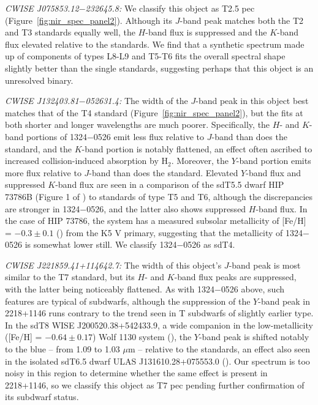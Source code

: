 \documentclass[twocolumn,tighten,twocolappendix]{aastex631}
\begin{document}
{\it CWISE J075853.12$-$232645.8:} We classify this object as T2.5 pec (Figure~\ref{fig:nir_spec_panel2}). Although its $J$-band peak matches both the T2 and T3 standards equally well, the $H$-band flux is suppressed and the $K$-band flux elevated relative to the standards. We find that a synthetic spectrum made up of components of types L8-L9 and T5-T6 fits the overall spectral shape slightly better than the single standards, suggesting perhaps that this object is an unresolved binary.

{\it CWISE J132403.81$-$052631.4:} The width of the $J$-band peak in this object best matches that of the T4 standard (Figure~\ref{fig:nir_spec_panel2}), but the fits at both shorter and longer wavelengths are much poorer. Specifically, the $H$- and $K$-band portions of 1324$-$0526 emit less flux relative to $J$-band than does the standard, and the $K$-band portion is notably flattened, an effect often ascribed to increased collision-induced absorption by H$_2$. Moreover, the $Y$-band portion emits more flux relative to $J$-band than does the standard. Elevated $Y$-band flux and suppressed $K$-band flux are seen in a comparison of the sdT5.5 dwarf HIP 73786B (Figure 1 of \citealt{zhang2019}) to standards of type T5 and T6, although the discrepancies are stronger in 1324$-$0526, and the latter also shows suppressed $H$-band flux. In the case of HIP 73786, the system has a measured subsolar metallicity of [Fe/H] = $-0.3{\pm}0.1$ ({\citealt{murray2011}}) from the K5 V primary, suggesting that the metallicity of 1324$-$0526 is somewhat lower still. We classify 1324$-$0526 as sdT4.

{\it CWISE J221859.41+114642.7:} The width of this object's $J$-band peak is most similar to the T7 standard, but its $H$- and $K$-band flux peaks are suppressed, with the latter being noticeably flattened. As with 1324$-$0526 above, such features are typical of subdwarfs, although the suppression of the $Y$-band peak in 2218+1146 runs contrary to the trend seen in T subdwarfs of slightly earlier type. In the sdT8 WISE J200520.38+542433.9, a wide companion in the low-metallicity ([Fe/H] = $-0.64{\pm}0.17$) Wolf 1130 system (\citealt{mace2013b}), the $Y$-band peak is shifted notably to the blue -- from 1.09 to 1.03 $\mu$m -- relative to the standards, an effect also seen in the isolated sdT6.5 dwarf ULAS J131610.28+075553.0 (\citealt{burningham2014}). Our spectrum is too noisy in this region to determine whether the same effect is present in 2218+1146, so we classify this object as T7 pec pending further confirmation of its subdwarf status.
\end{document}
